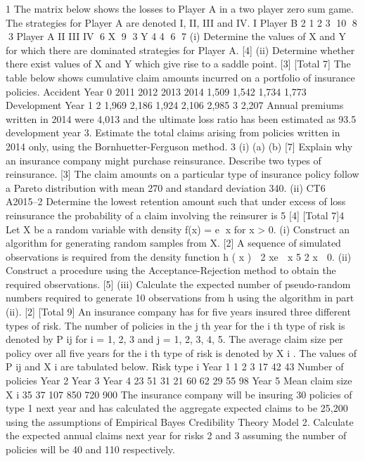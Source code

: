 \documentclass[a4paper,12pt]{article}
\begin{document}
1
The matrix below shows the losses to Player A in a two player zero sum game. The
strategies for Player A are denoted I, II, III and IV.
I
Player B
2
1
2
3
10
8
3
Player A
II
III IV
6
X
9 3
Y
4
4
6
7
(i) Determine the values of X and Y for which there are dominated strategies for
Player A.
[4]
(ii) Determine whether there exist values of X and Y which give rise to a saddle
point.
[3]
[Total 7]
The table below shows cumulative claim amounts incurred on a portfolio of insurance
policies.
Accident Year
0
2011
2012
2013
2014
1,509
1,542
1,734
1,773
Development Year
1
2
1,969
2,186
1,924
2,106
2,985
3
2,207
Annual premiums written in 2014 were 4,013 and the ultimate loss ratio has been
estimated as 93.5%
development year 3.
Estimate the total claims arising from policies written in 2014 only, using the
Bornhuetter-Ferguson method.
3
(i)
(a)
(b)
[7]
Explain why an insurance company might purchase reinsurance.
Describe two types of reinsurance.
[3]
The claim amounts on a particular type of insurance policy follow a Pareto
distribution with mean 270 and standard deviation 340.
(ii)
CT6 A2015–2
Determine the lowest retention amount such that under excess of loss
reinsurance the probability of a claim involving the reinsurer is 5%
[4]
[Total 7]4
Let X be a random variable with density f(x) = e x for x > 0.
(i)
Construct an algorithm for generating random samples from X.
[2]
A sequence of simulated observations is required from the density function
h ( x )  2 xe  x
5
2
x  0.
(ii) Construct a procedure using the Acceptance-Rejection method to obtain the
required observations.
[5]
(iii) Calculate the expected number of pseudo-random numbers required to
generate 10 observations from h using the algorithm in part (ii).
[2]
[Total 9]
An insurance company has for five years insured three different types of risk. The
number of policies in the j th year for the i th type of risk is denoted by P ij for i = 1, 2, 3
and j = 1, 2, 3, 4, 5. The average claim size per policy over all five years for the i th
type of risk is denoted by X i . The values of P ij and X i are tabulated below.
Risk type i Year 1
1
2
3 17
42
43
Number of policies
Year 2
Year 3
Year 4
23
51
31
21
60
62
29
55
98
Year 5 Mean claim size
X i
35
37
107 850
720
900
The insurance company will be insuring 30 policies of type 1 next year and has
calculated the aggregate expected claims to be 25,200 using the assumptions of
Empirical Bayes Credibility Theory Model 2.
Calculate the expected annual claims next year for risks 2 and 3 assuming the number
of policies will be 40 and 110 respectively.
\newpage
\end{document}
